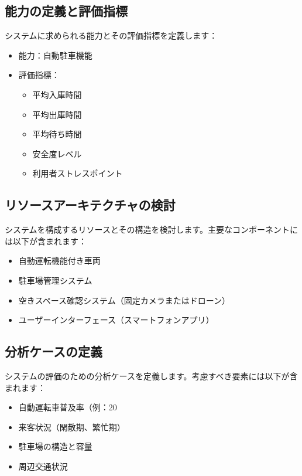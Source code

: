 \subsection{能力の定義と評価指標}

システムに求められる能力とその評価指標を定義します：

\begin{itemize}
    \item 能力：自動駐車機能
    \item 評価指標：
    \begin{itemize}
        \item 平均入庫時間
        \item 平均出庫時間
        \item 平均待ち時間
        \item 安全度レベル
        \item 利用者ストレスポイント
    \end{itemize}
\end{itemize}

\subsection{リソースアーキテクチャの検討}

システムを構成するリソースとその構造を検討します。主要なコンポーネントには以下が含まれます：

\begin{itemize}
    \item 自動運転機能付き車両
    \item 駐車場管理システム
    \item 空きスペース確認システム（固定カメラまたはドローン）
    \item ユーザーインターフェース（スマートフォンアプリ）
\end{itemize}

\subsection{分析ケースの定義}

システムの評価のための分析ケースを定義します。考慮すべき要素には以下が含まれます：

\begin{itemize}
    \item 自動運転車普及率（例：20%
    \item 来客状況（閑散期、繁忙期）
    \item 駐車場の構造と容量
    \item 周辺交通状況
\end{itemize}

